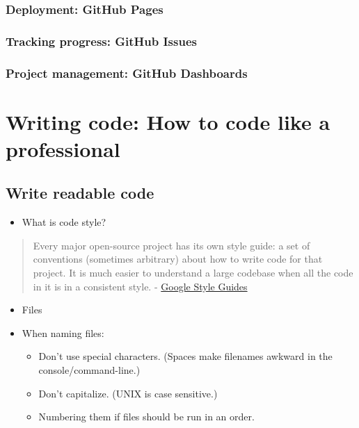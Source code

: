 \documentclass[
]{book}
\providecommand{\tightlist}{%
  \setlength{\itemsep}{0pt}\setlength{\parskip}{0pt}}
\begin{document}
\hypertarget{deployment-github-pages}{%
\subsubsection{Deployment: GitHub Pages}\label{deployment-github-pages}}

\hypertarget{tracking-progress-github-issues}{%
\subsubsection{Tracking progress: GitHub Issues}\label{tracking-progress-github-issues}}

\hypertarget{project-management-github-dashboards}{%
\subsubsection{Project management: GitHub Dashboards}\label{project-management-github-dashboards}}

\hypertarget{writing-code-how-to-code-like-a-professional}{%
\section{Writing code: How to code like a professional}\label{writing-code-how-to-code-like-a-professional}}

\hypertarget{write-readable-code}{%
\subsection{Write readable code}\label{write-readable-code}}

\begin{itemize}
\tightlist
\item
  What is code style?
\end{itemize}

\begin{quote}
Every major open-source project has its own style guide: a set of conventions (sometimes arbitrary) about how to write code for that project. It is much easier to understand a large codebase when all the code in it is in a consistent style. - \href{https://google.github.io/styleguide/}{Google Style Guides}
\end{quote}

\begin{itemize}
\tightlist
\item
  Files
\item
  When naming files:

  \begin{itemize}
  \tightlist
  \item
    Don't use special characters. (Spaces make filenames awkward in the console/command-line.)
  \item
    Don't capitalize. (UNIX is case sensitive.)
  \item
    Numbering them if files should be run in an order.
  \end{itemize}
\end{itemize}
\end{document}
